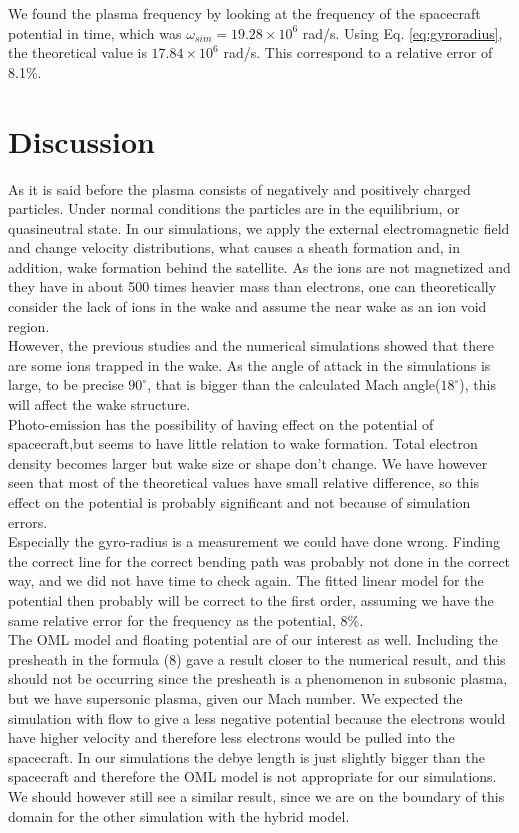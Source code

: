 \documentclass[aip, 
rsi, 
amsmath,
amssymb,
longbibliography,
preprint]{revtex4-1}
\begin{document}
We found the plasma frequency by looking at the frequency of the spacecraft potential in time, which was $\omega_{sim} = 19.28\times 10^{6}$ rad/s. Using Eq. \ref{eq:gyroradius}, the theoretical value is $17.84\times 10^{6}$ rad/s. This correspond to a relative error of 8.1\%.

\section{Discussion}

As it is said before the plasma consists of negatively and positively charged particles. Under normal conditions the particles are in the equilibrium, or quasineutral state. In our simulations, we apply the external electromagnetic field and change velocity distributions, what causes a sheath formation and, in addition, wake formation behind the satellite. As the ions are not magnetized and they have in about 500 times heavier mass than electrons, one can theoretically consider the lack of ions in the wake and assume the near wake as an ion void region.\\

However, the previous studies \cite{P1} and the numerical simulations showed that there are some ions trapped in the wake. As the angle of attack in the simulations is large, to be precise $90^{\circ}$, that is bigger than the calculated Mach angle($18^{\circ}$), this will affect the wake structure.\\

Photo-emission has the possibility of having effect on the potential of spacecraft,but seems to have little relation to wake formation. Total electron density becomes larger but wake size or shape don't change. We have however seen that most of the theoretical values have small relative difference, so this effect on the potential is probably significant and not because of simulation errors.\\

Especially the gyro-radius is a measurement we could have done wrong. Finding the correct line for the correct bending path was probably not done in the correct way, and we did not have time to check again. The fitted linear model for the potential then probably will be correct to the first order, assuming we have the same relative error for the frequency as the potential, $8\%$.\\

The OML model and floating potential are of our interest as well. Including the presheath in the formula (8) gave a result closer to the numerical result, and this should not be occurring since the presheath is a phenomenon in subsonic plasma, but we have supersonic plasma, given our Mach number. We expected the simulation with flow to give a less negative potential because the electrons would have higher velocity and therefore less electrons would be pulled into the spacecraft. In our simulations the debye length is just slightly bigger than the spacecraft and therefore the OML model is not appropriate for our simulations. We should however still see a similar result, since we are on the boundary of this domain for the other simulation with the hybrid model\cite{P7}.\\
\end{document}
